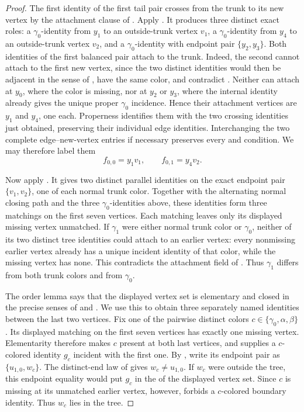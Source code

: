 \begin{proof}
The first identity of the first tail pair crosses from the trunk to its
new vertex by the attachment clause of .  Apply
.  It produces three distinct exact
roles: a $\gamma_0$-identity from $y_1$ to an outside-trunk vertex $v_1$,
a $\gamma_0$-identity from $y_4$ to an outside-trunk vertex $v_2$, and a
$\gamma_0$-identity with endpoint pair $\{y_2,y_3\}$.  Both identities
of the first balanced pair attach to the trunk.  Indeed, the second
cannot attach to the first new vertex, since the two distinct identities
would then be adjacent in the sense of , have the
same color, and contradict .  Neither can
attach at $y_0$, where the color is missing, nor at $y_2$ or $y_3$, where
the internal identity already gives the unique proper $\gamma_0$
incidence.  Hence their attachment vertices are $y_1$ and $y_4$, one
each.  Properness identifies them with the two crossing identities just
obtained, preserving their individual edge identities.  Interchanging
the two complete edge--new-vertex entries if necessary preserves every
 and  condition.  We may
therefore label them
\[
 f_{0,0}=y_1v_1,\qquad f_{0,1}=y_4v_2.
\]

Now apply .  It gives two distinct
parallel identities on the exact endpoint pair $\{v_1,v_2\}$, one of
each normal trunk color.  Together with the alternating normal closing
path and the three $\gamma_0$-identities above, these identities form
three matchings on the first seven vertices.  Each matching leaves only
its displayed missing vertex unmatched.  If $\gamma_1$ were either
normal trunk color or $\gamma_0$, neither of its two distinct tree
identities could attach to an earlier vertex: every nonmissing earlier
vertex already has a unique incident identity of that color, while the
missing vertex has none.  This contradicts the attachment field of
.  Thus $\gamma_1$ differs from both trunk colors
and from $\gamma_0$.

The order lemma  says that the displayed
vertex set is elementary and closed in the precise senses of
 and
.  We use this to obtain three separately
named identities between the last two vertices.  Fix one of the pairwise
distinct colors $c\in\{\gamma_0,\alpha,\beta\}$.  Its displayed matching
on the first seven vertices has exactly one missing vertex.  Elementarity
therefore makes $c$ present at both last vertices, and
 supplies a $c$-colored identity $g_c$ incident
with the first one.  By , write its endpoint pair as
$\{u_{1,0},w_c\}$.  The distinct-end law of
 gives $w_c\ne u_{1,0}$.  If $w_c$ were
outside the tree, this endpoint equality would put $g_c$ in the
 of the displayed vertex set.  Since $c$ is
missing at its unmatched earlier vertex, however,
 forbids a $c$-colored boundary identity.
Thus $w_c$ lies in the tree.


\end{proof}
